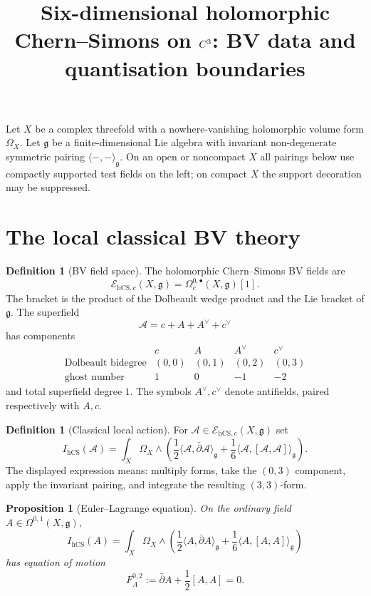 \documentclass[11pt]{amsart}
\title{Six-dimensional holomorphic Chern--Simons on \texorpdfstring{$C^3$}{C3}: BV data and quantisation boundaries}
\author{}
\date{}
\providecommand{\dbar}{\bar{\partial}}
\providecommand{\g}{\mathfrak{g}}
\providecommand{\hCS}{\mathrm{hCS}}
\theoremstyle{plain}
\newtheorem{proposition}[theorem]{Proposition}
\theoremstyle{definition}
\newtheorem{definition}[theorem]{Definition}
\theoremstyle{remark}
\begin{document}
\maketitle

Let \(X\) be a complex threefold with a nowhere-vanishing holomorphic
volume form \(\Omega_X\). Let \(\g\) be a finite-dimensional Lie algebra
with invariant non-degenerate symmetric pairing
\(\langle-,-\rangle_\g\). On an open or noncompact \(X\) all pairings
below use compactly supported test fields on the left; on compact \(X\)
the support decoration may be suppressed.

\section{The local classical BV theory}

\begin{definition}[BV field space]
The holomorphic Chern--Simons BV fields are
\[
  \mathcal E_{\hCS,c}(X,\g)
  =
  \Omega^{0,\bullet}_c(X,\g)[1].
\]
The bracket is the product of the Dolbeault wedge product and the Lie
bracket of \(\g\). The superfield
\[
  \mathcal A = c + A + A^\vee + c^\vee
\]
has components
\[
\begin{array}{c|cccc}
 & c & A & A^\vee & c^\vee \\ \hline
\text{Dolbeault bidegree} & (0,0) & (0,1) & (0,2) & (0,3)\\
\text{ghost number} & 1 & 0 & -1 & -2
\end{array}
\]
and total superfield degree \(1\). The symbols \(A^\vee,c^\vee\)
denote antifields, paired respectively with \(A,c\).
\end{definition}

\begin{definition}[Classical local action]
For \(\mathcal A\in\mathcal E_{\hCS,c}(X,\g)\) set
\[
  I_{\hCS}(\mathcal A)
  =
  \int_X \Omega_X\wedge
  \left(
    \frac{1}{2}\langle \mathcal A,\dbar\mathcal A\rangle_\g
    +
    \frac{1}{6}\langle \mathcal A,[\mathcal A,\mathcal A]\rangle_\g
  \right).
\]
The displayed expression means: multiply forms, take the \((0,3)\)
component, apply the invariant pairing, and integrate the resulting
\((3,3)\)-form.
\end{definition}

\begin{proposition}[Euler--Lagrange equation]
On the ordinary field \(A\in\Omega^{0,1}(X,\g)\),
\[
  I_{\hCS}(A)
  =
  \int_X \Omega_X\wedge
  \left(
    \frac{1}{2}\langle A,\dbar A\rangle_\g
    +
    \frac{1}{6}\langle A,[A,A]\rangle_\g
  \right)
\]
has equation of motion
\[
  F_A^{0,2}:=\dbar A+\frac{1}{2}[A,A]=0.
\]
\end{proposition}
\end{document}
